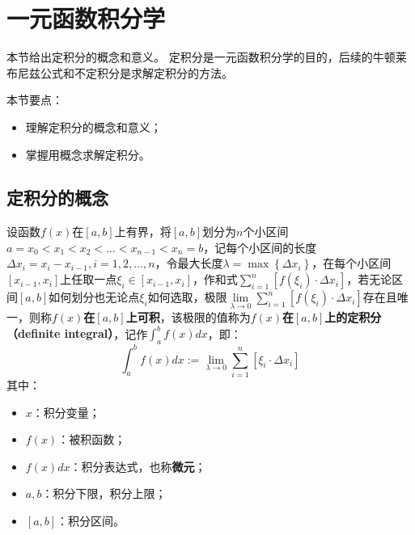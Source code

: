\section{一元函数积分学}

本节给出定积分的概念和意义。
定积分是一元函数积分学的目的，后续的牛顿莱布尼兹公式和不定积分是求解定积分的方法。

本节要点：
\begin{itemize}
    \item 理解定积分的概念和意义；
    \item 掌握用概念求解定积分。
\end{itemize}

\subsection{定积分的概念}

\begin{definition}[定积分]
设函数$f\left( x \right) $在$\left[ a,b \right] $上有界，将$\left[ a,b \right] $划分为$n$个小区间$a=x_0<x_1<x_2<...<x_{n-1}<x_n=b$，记每个小区间的长度$\Delta x_i=x_i-x_{i-1},i=1,2,...,n$，令最大长度$\lambda =\max \left\{ \Delta x_i \right\} $，在每个小区间$\left[ x_{i-1},x_i \right] $上任取一点$\xi _i\in \left[ x_{i-1},x_i \right] $，作和式$\sum_{i=1}^n{\left[ f\left( \xi _i \right) \cdot \Delta x_i \right]}$，若无论区间$\left[ a,b \right] $如何划分也无论点$\xi _i$如何选取，极限$\underset{\lambda \rightarrow 0}{\lim}\sum_{i=1}^n{\left[ f\left( \xi _i \right) \cdot \Delta x_i \right]}$存在且唯一，则称{\bf $f\left( x \right) $在$\left[ a,b \right] $上可积}，该极限的值称为{\bf $f\left( x \right) $在$\left[ a,b \right] $上的定积分（definite integral）}，记作$\int_a^b{f\left( x \right) dx}$，即：
\[
\int_a^b{f\left( x \right) dx}:=\underset{\lambda \rightarrow 0}{\lim}\sum_{i=1}^n{\left[ \xi _i\cdot \Delta x_i \right]}
\]
其中：
\begin{itemize}
    \item $x$：积分变量；
    \item $f\left( x \right) $：被积函数；
    \item $f\left( x \right) dx$：积分表达式，也称{\bf 微元}；
    \item $a,b$：积分下限，积分上限；
    \item $\left[ a,b \right] $：积分区间。
\end{itemize}
\end{definition}

